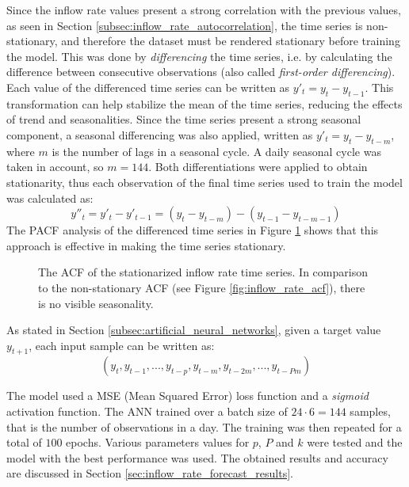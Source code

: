 Since the inflow rate values present a strong correlation with the previous values, as seen in Section \ref{subsec:inflow_rate_autocorrelation}, the time series is non-stationary, and therefore the dataset must be rendered stationary before training the model. This was done by \emph{differencing} the time series, i.e. by calculating the difference between consecutive observations (also called \emph{first-order differencing}). Each value of the differenced time series can be written as \( y'_t = y_t - y_{t-1} \). This transformation can help stabilize the mean of the time series, reducing the effects of trend and seasonalities. Since the time series present a strong seasonal component, a seasonal differencing was also applied, written as \( y'_t = y_t - y_{t-m} \), where \( m \) is the number of lags in a seasonal cycle. A daily seasonal cycle was taken in account, so \( m = 144 \). Both differentiations were applied to obtain stationarity, thus each observation of the final time series used to train the model was calculated as:
\begin{equation}
  y''_t = y'_t - y'_{t-1} = (y_t - y_{t-m}) - (y_{t-1} - y_{t-m-1})
\end{equation}
The PACF analysis of the differenced time series in Figure \ref{fig:stationary_inflow_rate_acf} shows that this approach is effective in making the time series stationary.

\begin{figure}
  \begin{center}
  \end{center}
  \caption{The ACF of the stationarized inflow rate time series. In comparison to the non-stationary ACF (see Figure \ref{fig:inflow_rate_acf}), there is no visible seasonality.}
  \label{fig:stationary_inflow_rate_acf}
\end{figure}

As stated in Section \ref{subsec:artificial_neural_networks}, given a target value \( y_{t+1} \), each input sample can be written as:
\[
  (y_{t}, y_{t-1}, ..., y_{t-p}, y_{t-m}, y_{t-2m}, ..., y_{t-Pm})
\]

The model used a MSE (Mean Squared Error) loss function and a \emph{sigmoid} activation function. The ANN trained over a batch size of \( 24 \cdot 6 = 144 \) samples, that is the number of observations in a day. The training was then repeated for a total of \( 100 \) epochs. Various parameters values for \( p \), \( P \) and \( k \) were tested and the model with the best performance was used. The obtained results and accuracy are discussed in Section \ref{sec:inflow_rate_forecast_results}.

